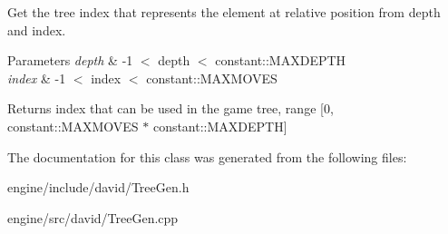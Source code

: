 Get the tree index that represents the element at relative position from depth and index.


\begin{DoxyParams}{Parameters}
{\em depth} & -\/1 $<$ depth $<$ constant\+::\+M\+A\+X\+D\+E\+P\+TH \\
\hline
{\em index} & -\/1 $<$ index $<$ constant\+::\+M\+A\+X\+M\+O\+V\+ES \\
\hline
\end{DoxyParams}
\begin{DoxyReturn}{Returns}
index that can be used in the game tree, range \mbox{[}0, constant\+::\+M\+A\+X\+M\+O\+V\+ES $\ast$ constant\+::\+M\+A\+X\+D\+E\+P\+TH\mbox{]} 
\end{DoxyReturn}


The documentation for this class was generated from the following files\+:\begin{DoxyCompactItemize}
\item 
engine/include/david/Tree\+Gen.\+h\item 
engine/src/david/Tree\+Gen.\+cpp\end{DoxyCompactItemize}
